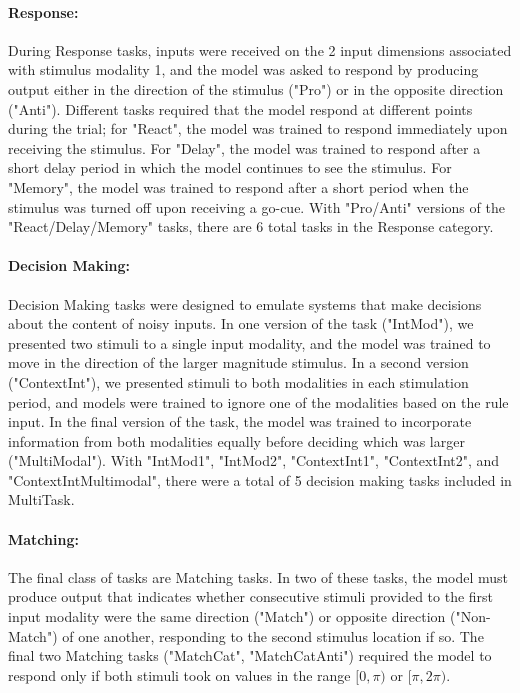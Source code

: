 \documentclass{article}
\begin{document}
\paragraph{Response:} During Response tasks, inputs were received on the 2 input dimensions associated with stimulus modality 1, and the model was asked to respond by producing output either in the direction of the stimulus ("Pro") or in the opposite direction ("Anti"). Different tasks required that the model respond at different points during the trial; for "React", the model was trained to respond immediately upon receiving the stimulus. For "Delay", the model was trained to respond after a short delay period in which the model continues to see the stimulus. For "Memory", the model was trained to respond after a short period when the stimulus was turned off upon receiving a go-cue. With "Pro/Anti" versions of the "React/Delay/Memory" tasks, there are 6 total tasks in the Response category.
\paragraph{Decision Making:} Decision Making tasks were designed to emulate systems that make decisions about the content of noisy inputs. In one version of the task ("IntMod"), we presented two stimuli to a single input modality, and the model was trained to move in the direction of the larger magnitude stimulus. In a second version ("ContextInt"), we presented stimuli to both modalities in each stimulation period, and models were trained to ignore one of the modalities based on the rule input. In the final version of the task, the model was trained to incorporate information from both modalities equally before deciding which was larger ("MultiModal"). With "IntMod1", "IntMod2", "ContextInt1", "ContextInt2", and "ContextIntMultimodal", there were a total of 5 decision making tasks included in MultiTask.
\paragraph{Matching:} The final class of tasks are Matching tasks. In two of these tasks, the model must produce output that indicates whether consecutive stimuli provided to the first input modality were the same direction ("Match") or opposite direction ("Non-Match") of one another, responding to the second stimulus location if so. The final two Matching tasks ("MatchCat", "MatchCatAnti") required the model to respond only if both stimuli took on values in the range $[0, \pi)$ or $[\pi, 2\pi)$.
\end{document}
